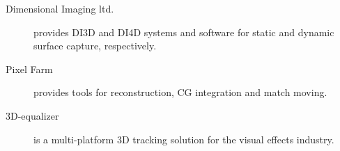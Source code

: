 \begin{description}
	\item[Dimensional Imaging ltd.] provides DI3D and DI4D systems and software for static and dynamic surface capture, respectively. \cite{di4d}
	\item[Pixel Farm] provides tools for reconstruction, CG integration and match moving. \cite{pixelfarm}
	\item[3D-equalizer] is a multi-platform 3D tracking solution for the visual effects industry. \cite{3dequalizer}
\end{description}





%
%
%
%
%
%
%
%

